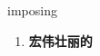 
\begin{frame}
{\huge imposing}
\begin{center}
\begin{enumerate}\Large
  \item \textbf{宏伟壮丽的}
\end{enumerate}
\end{center}
\end{frame}
